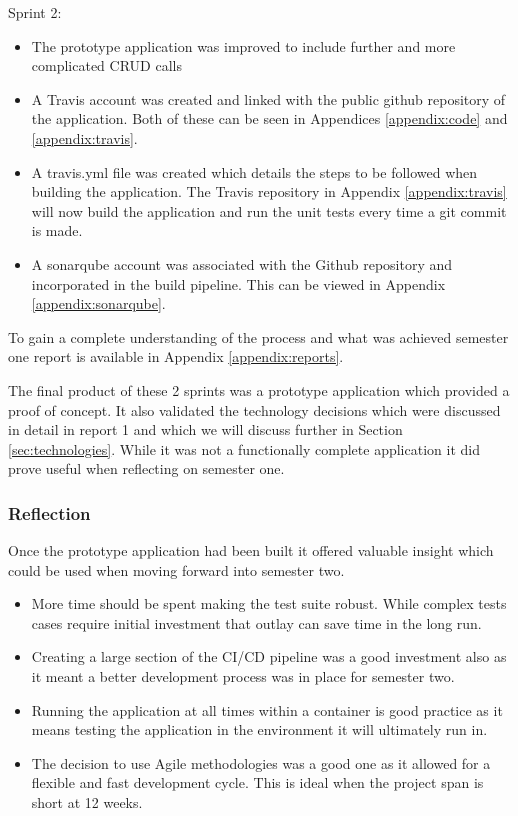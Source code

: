 Sprint 2:
\begin{itemize}
	\item The prototype application was improved to include further and more complicated \gls{CRUD} calls
	\item A \gls{Travis} account was created and linked with the public \gls{github} repository of the application. Both of these can be seen in Appendices \ref{appendix:code} and \ref{appendix:travis}.
	\item A travis.yml file was created which details the steps to be followed when building the application. The Travis repository in Appendix \ref{appendix:travis} will now build the application and run the unit tests every time a \gls{git} commit is made.
	\item A \gls{sonarqube} account was associated with the Github repository and incorporated in the build pipeline. This can be viewed in Appendix \ref{appendix:sonarqube}.
\end{itemize}
	
To gain a complete understanding of the process and what was achieved semester one report is available in Appendix \ref{appendix:reports}.
	
The final product of these 2 \gls{sprint}s was a prototype application which provided a proof of concept. It also validated the technology decisions which were discussed in detail in report 1 and which we will discuss further in Section \ref{sec:technologies}. While it was not a functionally complete application it did prove useful when reflecting on semester one.
	
\subsubsection{Reflection}
Once the prototype application had been built it offered valuable insight which could be used when moving forward into semester two.

\begin{itemize}
	\item More time should be spent making the test suite robust. While complex tests cases require initial investment that outlay can save time in the long run.
	\item Creating a large section of the CI/CD pipeline was a good investment also as it meant a better development process was in place for semester two.
	\item Running the application at all times within a container is good practice as it means testing the application in the environment it will ultimately run in.
	\item The decision to use Agile methodologies was a good one as it allowed for a flexible and fast development cycle. This is ideal when the project span is short at 12 weeks.
\end{itemize}
